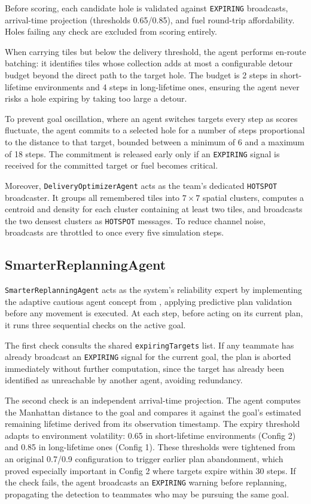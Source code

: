 \documentclass[letterpaper]{article}
\begin{document}
Before scoring, each candidate hole is validated against \texttt{EXPIRING}
broadcasts, arrival-time projection (thresholds 0.65/0.85), and fuel round-trip
affordability. Holes failing any check are excluded from scoring entirely.

When carrying tiles but below the delivery threshold, the agent performs en-route
batching: it identifies tiles whose collection adds at most a configurable detour
budget beyond the direct path to the target hole. The budget is 2 steps in
short-lifetime environments and 4 steps in long-lifetime ones, ensuring the
agent never risks a hole expiring by taking too large a detour.

To prevent goal oscillation, where an agent switches targets every step as
scores fluctuate, the agent commits to a selected hole for a number of steps
proportional to the distance to that target, bounded between a minimum of 6 and
a maximum of 18 steps. The commitment is released early only if an
\texttt{EXPIRING} signal is received for the committed target or fuel becomes
critical.

Moreover, \texttt{DeliveryOptimizerAgent} acts as the team's dedicated
\texttt{HOTSPOT} broadcaster. It groups all remembered tiles into $7 \times 7$
spatial clusters, computes a centroid and density for each cluster containing at
least two tiles, and broadcasts the two densest clusters as \texttt{HOTSPOT}
messages. To reduce channel noise, broadcasts are throttled to once every five
simulation steps.

\subsection{SmarterReplanningAgent}


\texttt{SmarterReplanningAgent} acts as the system's reliability expert by implementing the adaptive cautious agent concept from , applying predictive plan validation before any movement is executed. At each step, before acting on its current plan, it runs three sequential checks on the active goal.

The first check consults the shared \texttt{expiringTargets} list. If any
teammate has already broadcast an \texttt{EXPIRING} signal for the current goal,
the plan is aborted immediately without further computation, since the target has
already been identified as unreachable by another agent, avoiding redundancy.

The second check is an independent arrival-time projection. The agent computes
the Manhattan distance to the goal and compares it against the goal's estimated
remaining lifetime derived from its observation timestamp. The expiry threshold
adapts to environment volatility: 0.65 in short-lifetime environments (Config 2)
and 0.85 in long-lifetime ones (Config 1). These thresholds were tightened from
an original 0.7/0.9 configuration to trigger earlier plan abandonment, which
proved especially important in Config 2 where targets expire within 30 steps. If
the check fails, the agent broadcasts an \texttt{EXPIRING} warning before
replanning, propagating the detection to teammates who may be pursuing the same
goal.
\end{document}
